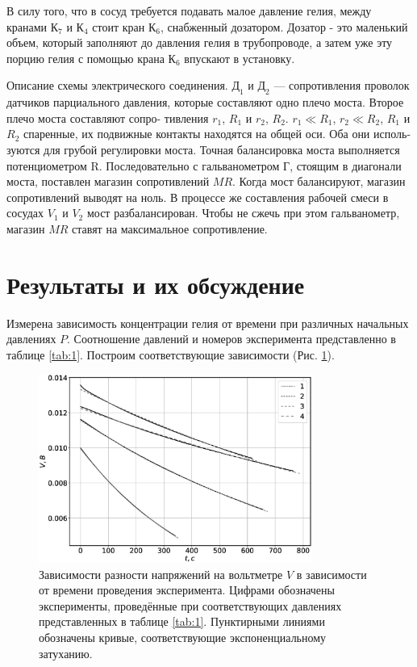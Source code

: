 \documentclass[12pt]{article}
\begin{document}
В силу того, что в сосуд требуется подавать малое давление гелия,
между кранами $К_7$ и $К_4$ стоит кран $К_6$, снабженный дозатором. Дозатор - это маленький объем, который заполняют до давления гелия в трубопроводе, а затем уже эту порцию гелия с помощью крана $К_6$ впускают в установку.

Описание схемы электрического соединения. $Д_1$ и $Д_2$ — сопротивления проволок датчиков парциального давления, которые составляют одно плечо моста. Второе плечо моста составляют сопро- тивления $r_1$, $R_1$ и $r_2$, $R_2$. $r_1 \ll R_1$, $r_2 \ll R_2$, $R_1$ и $R_2$ спаренные, их подвижные контакты находятся на общей оси. Оба они исполь- зуются для грубой регулировки моста. Точная балансировка моста выполняется потенциометром R. Последовательно с гальванометром $Г$, стоящим в диагонали моста, поставлен магазин сопротивлений $MR$. Когда мост балансируют, магазин сопротивлений выводят на ноль. В процессе же составления рабочей смеси в сосудах $V_1$ и $V_2$ мост разбалансирован. Чтобы не сжечь при этом гальванометр, магазин $MR$ ставят на максимальное сопротивление.


\section{Результаты и их обсуждение}
Измерена зависимость концентрации гелия от времени при различных начальных давлениях $P$. Соотношение 
давлений и номеров эксперимента представленно в таблице \ref{tab:1}. Построим соответствующие зависимости 
(Рис. \ref{fig:Vt}).   

\begin{figure}[H]
    \centering
    \includegraphics[width=0.8\textwidth]{Vt.eps}
    \caption{Зависимости разности напряжений на вольтметре $V$ в зависимости от времени проведения
        эксперимента. Цифрами обозначены эксперименты, проведённые при соответствующих давлениях представленных 
        в таблице \ref{tab:1}. Пунктирными линиями обозначены кривые, соответствующие экспоненциальному 
        затуханию.}
    \label{fig:Vt}
\end{figure}
\end{document}
